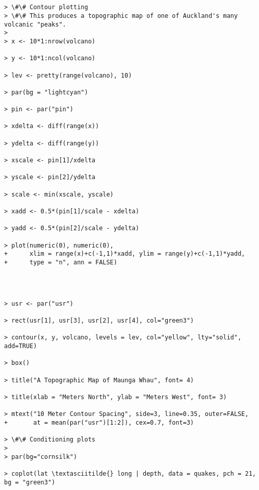 \documentclass[11pt]{article}
\begin{document}
    \begin{center}
    \end{center}
    { \hspace*{\fill} \\}
    
    \begin{Verbatim}[commandchars=\\\{\}]

> \#\# Contour plotting
> \#\# This produces a topographic map of one of Auckland's many volcanic "peaks".
> 
> x <- 10*1:nrow(volcano)

> y <- 10*1:ncol(volcano)

> lev <- pretty(range(volcano), 10)

> par(bg = "lightcyan")

> pin <- par("pin")

> xdelta <- diff(range(x))

> ydelta <- diff(range(y))

> xscale <- pin[1]/xdelta

> yscale <- pin[2]/ydelta

> scale <- min(xscale, yscale)

> xadd <- 0.5*(pin[1]/scale - xdelta)

> yadd <- 0.5*(pin[2]/scale - ydelta)

> plot(numeric(0), numeric(0),
+      xlim = range(x)+c(-1,1)*xadd, ylim = range(y)+c(-1,1)*yadd,
+      type = "n", ann = FALSE)

    \end{Verbatim}

    \begin{center}
    \end{center}
    { \hspace*{\fill} \\}
    
    \begin{Verbatim}[commandchars=\\\{\}]

> usr <- par("usr")

> rect(usr[1], usr[3], usr[2], usr[4], col="green3")

> contour(x, y, volcano, levels = lev, col="yellow", lty="solid", add=TRUE)

> box()

> title("A Topographic Map of Maunga Whau", font= 4)

> title(xlab = "Meters North", ylab = "Meters West", font= 3)

> mtext("10 Meter Contour Spacing", side=3, line=0.35, outer=FALSE,
+       at = mean(par("usr")[1:2]), cex=0.7, font=3)

> \#\# Conditioning plots
> 
> par(bg="cornsilk")

> coplot(lat \textasciitilde{} long | depth, data = quakes, pch = 21, bg = "green3")

    \end{Verbatim}
\end{document}
